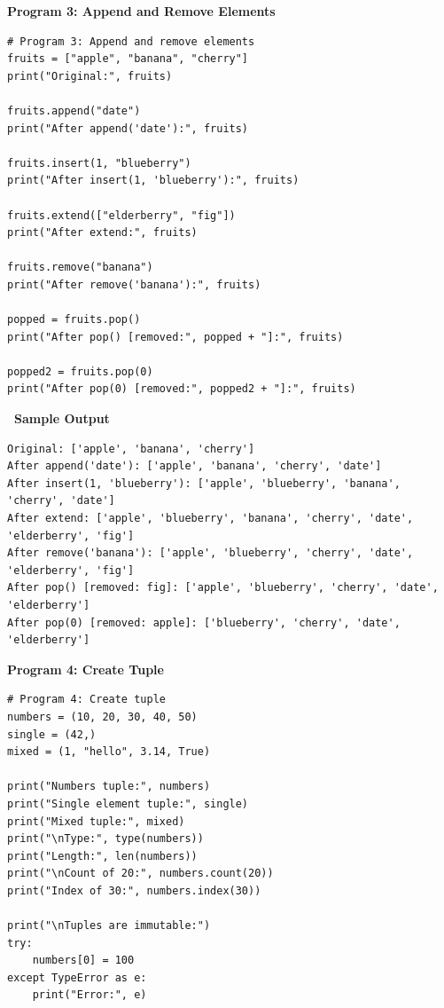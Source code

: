 \documentclass[12pt,a4paper]{article}
\newcommand{\outhead}{\noindent\colorbox{cmrgreen!25}%
  {\textbf{\small\color{cmrdark}~Sample Output~}}\par\vspace{-1pt}}
\begin{document}
\vspace{0.5cm}

\textbf{Program 3: Append and Remove Elements}

\begin{lstlisting}
# Program 3: Append and remove elements
fruits = ["apple", "banana", "cherry"]
print("Original:", fruits)

fruits.append("date")
print("After append('date'):", fruits)

fruits.insert(1, "blueberry")
print("After insert(1, 'blueberry'):", fruits)

fruits.extend(["elderberry", "fig"])
print("After extend:", fruits)

fruits.remove("banana")
print("After remove('banana'):", fruits)

popped = fruits.pop()
print("After pop() [removed:", popped + "]:", fruits)

popped2 = fruits.pop(0)
print("After pop(0) [removed:", popped2 + "]:", fruits)
\end{lstlisting}

\outhead
\begin{lstlisting}[style=outputstyle]
Original: ['apple', 'banana', 'cherry']
After append('date'): ['apple', 'banana', 'cherry', 'date']
After insert(1, 'blueberry'): ['apple', 'blueberry', 'banana', 'cherry', 'date']
After extend: ['apple', 'blueberry', 'banana', 'cherry', 'date', 'elderberry', 'fig']
After remove('banana'): ['apple', 'blueberry', 'cherry', 'date', 'elderberry', 'fig']
After pop() [removed: fig]: ['apple', 'blueberry', 'cherry', 'date', 'elderberry']
After pop(0) [removed: apple]: ['blueberry', 'cherry', 'date', 'elderberry']
\end{lstlisting}

\vspace{0.5cm}

\textbf{Program 4: Create Tuple}

\begin{lstlisting}
# Program 4: Create tuple
numbers = (10, 20, 30, 40, 50)
single = (42,)
mixed = (1, "hello", 3.14, True)

print("Numbers tuple:", numbers)
print("Single element tuple:", single)
print("Mixed tuple:", mixed)
print("\nType:", type(numbers))
print("Length:", len(numbers))
print("\nCount of 20:", numbers.count(20))
print("Index of 30:", numbers.index(30))

print("\nTuples are immutable:")
try:
    numbers[0] = 100
except TypeError as e:
    print("Error:", e)
\end{lstlisting}
\end{document}
